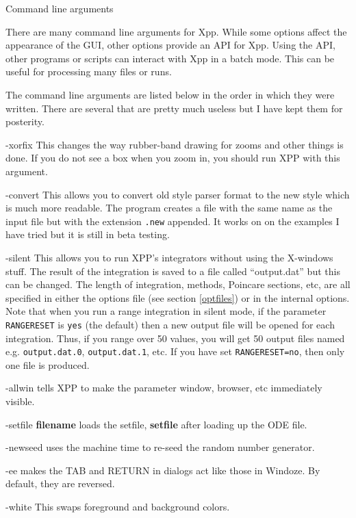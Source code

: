 \begin{center} {\large Command line arguments}\end{center}

\medskip
There are many command line arguments for Xpp.  While some options affect the appearance of the GUI, other options provide an API for Xpp.  Using the API, other programs or scripts can interact with Xpp in a batch mode.  This can be useful for processing many files or runs. 

The command line arguments are listed below in the order in which they were written. There are several that are pretty much useless but I have kept them for posterity. 
\begin{description}
\item{-xorfix} This changes the way rubber-band drawing for zooms and
other things is done. If you do not see a box when you zoom in, you
should run XPP with this argument.
\item{-convert}  This allows you to convert old style parser format to
the new style which is much more readable. The program creates a file
with the same name as the input file but with the extension {\tt .new}
appended. It works on on the examples I have tried but it is still in
beta testing.
\item{-silent} This allows you to run XPP's integrators without using
the X-windows stuff.  The result of the integration is saved to a file
called ``output.dat'' but this can be changed. The length of
integration, methods, Poincare sections, etc, are all specified in
either the options file (see section \ref{optfiles})
 or in the internal options. Note that when you run a range integration
in silent mode, if the parameter {\tt RANGERESET} is {\tt yes} (the default) 
then a new output file will be opened for each integration. Thus, if you range 
over 50 values, you will get 50 output files named e.g. {\tt output.dat.0}, 
{\tt output.dat.1}, etc. If you have set {\tt RANGERESET=no}, then only
one file is produced.
\item{-allwin} tells XPP to make the parameter window, browser, etc
immediately visible.
\item{-setfile {\bf filename}} loads the setfile, {\bf setfile} after
loading up the  ODE file.
\item{-newseed} uses the machine time to re-seed the random number
generator. 
\item{-ee} makes the TAB and RETURN in dialogs act like those in
Windoze. By default, they are reversed.  
\item{-white} This swaps foreground and background colors. 

\end{description}
